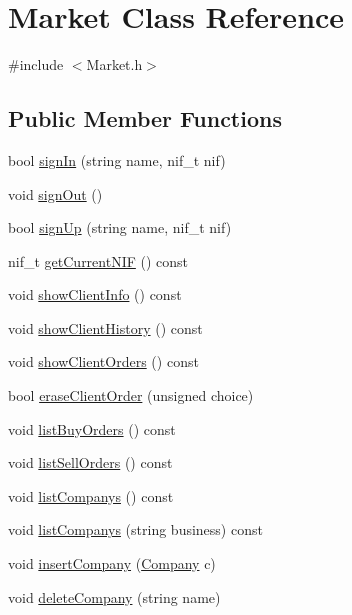 \hypertarget{class_market}{}\section{Market Class Reference}
\label{class_market}


{\ttfamily \#include $<$Market.\+h$>$}

\subsection*{Public Member Functions}
\begin{DoxyCompactItemize}
\item 
bool \hyperlink{class_market_a6b0d677963c278fc238c1efdd29ba43e}{sign\+In} (string name, nif\+\_\+t nif)
\item 
void \hyperlink{class_market_acbd4a1e28685f78b6b2c59aa5ca9874f}{sign\+Out} ()
\item 
bool \hyperlink{class_market_afd6b6aae4147a4bd0f00c9d5210730aa}{sign\+Up} (string name, nif\+\_\+t nif)
\item 
nif\+\_\+t \hyperlink{class_market_acc909b8410ea76b1dfecf92088264741}{get\+Current\+N\+IF} () const
\item 
void \hyperlink{class_market_ad55d5db41984c8c4f1f027cd1f720a0b}{show\+Client\+Info} () const
\item 
void \hyperlink{class_market_ab12d4a35aed820924483f336948cf4b4}{show\+Client\+History} () const
\item 
void \hyperlink{class_market_aa81ff10670a6d41b22573cb48c40938e}{show\+Client\+Orders} () const
\item 
bool \hyperlink{class_market_a84df7da0cc63a1ff6d22e467e5060758}{erase\+Client\+Order} (unsigned choice)
\item 
void \hyperlink{class_market_ac98d8412e09521e3db973801d642f561}{list\+Buy\+Orders} () const
\item 
void \hyperlink{class_market_aef2b499d00dd8428c4c8070bf599956d}{list\+Sell\+Orders} () const
\item 
void \hyperlink{class_market_a022de14760d31b423fab3a2711353951}{list\+Companys} () const
\item 
void \hyperlink{class_market_a450ea78ba7ac01e14e5d6266f220be35}{list\+Companys} (string business) const
\item 
void \hyperlink{class_market_a7f1813e9aa2359dd2dee084a8ae97154}{insert\+Company} (\hyperlink{class_company}{Company} c)
\item 
void \hyperlink{class_market_ac22c934965a47c17b68318c610a9d20f}{delete\+Company} (string name)

\end{DoxyCompactItemize}
